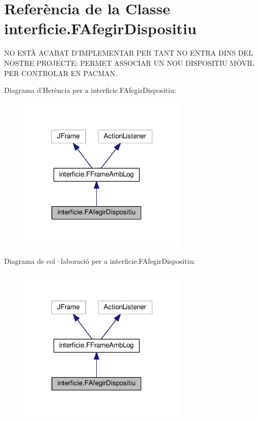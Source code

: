 \hypertarget{classinterficie_1_1_f_afegir_dispositiu}{\section{Referència de la Classe interficie.\+F\+Afegir\+Dispositiu}
\label{classinterficie_1_1_f_afegir_dispositiu}
}


N\+O E\+S\+TÀ A\+C\+A\+B\+A\+T D'I\+M\+P\+L\+E\+M\+E\+N\+T\+A\+R P\+E\+R T\+A\+N\+T N\+O E\+N\+T\+R\+A D\+I\+N\+S D\+E\+L N\+O\+S\+T\+R\+E P\+R\+O\+J\+E\+C\+T\+E; P\+E\+R\+M\+E\+T A\+S\+S\+O\+C\+I\+A\+R U\+N N\+O\+U D\+I\+S\+P\+O\+S\+I\+T\+I\+U MÒ\+V\+I\+L P\+E\+R C\+O\+N\+T\+R\+O\+L\+A\+R E\+N P\+A\+C\+M\+A\+N.  




Diagrama d'Herència per a interficie.\+F\+Afegir\+Dispositiu\+:
\nopagebreak
\begin{figure}[H]
\begin{center}
\leavevmode
\includegraphics[width=228pt]{classinterficie_1_1_f_afegir_dispositiu__inherit__graph}
\end{center}
\end{figure}


Diagrama de col·laboració per a interficie.\+F\+Afegir\+Dispositiu\+:
\nopagebreak
\begin{figure}[H]
\begin{center}
\leavevmode
\includegraphics[width=228pt]{classinterficie_1_1_f_afegir_dispositiu__coll__graph}
\end{center}
\end{figure}
